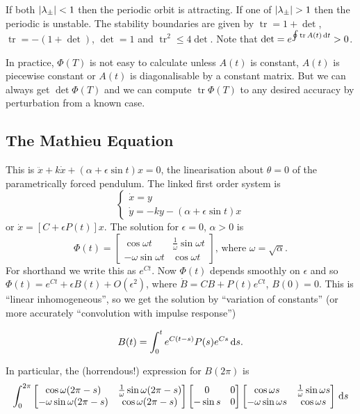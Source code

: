 \documentclass{notes}
\theoremstyle{plain}
\DeclareMathOperator{\tr}{tr}
\begin{document}
If both $\left|\lambda_\pm\right| < 1$ then the periodic orbit is attracting.
If one of $\left|\lambda_\pm\right| > 1$ then the periodic is unstable.  The
stability boundaries are given by $\tr = 1 + \det$, $\tr = - (1+\det)$,
$\det = 1$ and $\tr^2 \le 4 \det$.  Note that $\det = e^{\oint \tr
  A(t)\,\ud t} > 0$.

\vspace{4.5in}

In practice, $\Phi(T)$ is not easy to calculate unless $A(t)$ is constant,
$A(t)$ is piecewise constant or $A(t)$ is diagonalisable by a constant
matrix.  But we can always get $\det \Phi(T)$ and we can compute
$\tr \Phi(T)$ to any desired accuracy by perturbation from a known case.

\subsection{The Mathieu Equation}

This is $\ddot{x} + k \dot{x} + (\alpha + \epsilon \sin t) x = 0$,
the linearisation about $\theta = 0$ of the parametrically forced
pendulum.  The linked first order system is
\[
\begin{cases}
\dot{x} = y \\
\dot{y} = -k y - (\alpha + \epsilon \sin t) x
\end{cases}
\]
or $\dot{x} = \left[ C + \epsilon P(t) \right] x$.  The solution for
$\epsilon = 0$, $\alpha > 0$ is
\[
\Phi(t) = \begin{bmatrix}
\cos \omega t & \frac{1}{\omega} \sin \omega t \\
- \omega \sin \omega t & \cos \omega t
\end{bmatrix} \text{, where $\omega = \sqrt{\alpha}.$}
\]
For shorthand we write this as $e^{C t}$.  Now $\Phi(t)$ depends
smoothly on $\epsilon$ and so $\Phi(t) = e^{C t} + \epsilon B(t)
+ O(\epsilon^2)$, where $\dot{B} = C B + P(t) e^{C t}$, $B(0) = 0$.
This is ``linear inhomogeneous'', so we get the solution by ``variation
of constants'' (or more accurately ``convolution with impulse response'')

\[
B(t) = \int_0^t e^{C(t-s)} P(s) e^{C s}\,\mathrm{d} s.
\]

In particular, the (horrendous!) expression for $B(2 \pi)$ is
\[
\int_0^{2 \pi}
\begin{bmatrix}
\cos \omega (2\pi -s) & \frac{1}{\omega} \sin \omega (2\pi - s) \\
- \omega \sin \omega (2 \pi - s) & \cos \omega (2 \pi - s)
\end{bmatrix}
\begin{bmatrix}
0 & 0 \\
- \sin s & 0
\end{bmatrix}
\begin{bmatrix}
\cos \omega s & \frac{1}{\omega} \sin \omega s \\
- \omega \sin \omega s & \cos \omega s
\end{bmatrix}\,\mathrm{d} s
\]
\end{document}
